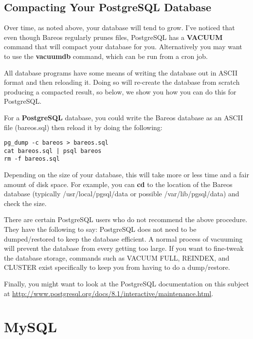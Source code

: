 \subsection{Compacting Your PostgreSQL Database}
\label{CompactingPostgres}

Over time, as noted above, your database will tend to grow. I've noticed that
even though Bareos regularly prunes files, PostgreSQL has a {\bf VACUUM}
command that will compact your database for you. Alternatively you may want to
use the {\bf vacuumdb} command, which can be run from a cron job.

All database programs have some means of writing the database out in ASCII
format and then reloading it. Doing so will re-create the database from
scratch producing a compacted result, so below, we show you how you can do
this for PostgreSQL.

For a {\bf PostgreSQL} database, you could write the Bareos database as an
ASCII file (bareos.sql) then reload it by doing the following:

\footnotesize
\begin{verbatim}
pg_dump -c bareos > bareos.sql
cat bareos.sql | psql bareos
rm -f bareos.sql
\end{verbatim}
\normalsize

Depending on the size of your database, this will take more or less time and a
fair amount of disk space. For example, you can {\bf cd} to the location of
the Bareos database (typically /usr/local/pgsql/data or possible
/var/lib/pgsql/data) and check the size.

There are certain PostgreSQL users who do not recommend the above
procedure. They have the following to say:
PostgreSQL does not
need to be dumped/restored to keep the database efficient.  A normal
process of vacuuming will prevent the database from every getting too
large.  If you want to fine-tweak the database storage, commands such
as VACUUM FULL, REINDEX, and CLUSTER exist specifically to keep you
from having to do a dump/restore.

Finally, you might want to look at the PostgreSQL documentation on
this subject at
\url{http://www.postgresql.org/docs/8.1/interactive/maintenance.html}.

\section{MySQL}
\label{CompactingMySQL}
